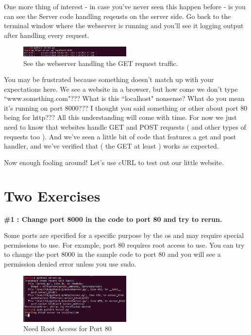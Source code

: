 \documentclass[10pt]{article}
\begin{document}
One more thing of interest - in case you've never seen this happen before - is you can see the Server code handling reqeusts on the server side. Go back to the terminal window where the webserver is running and you'll see it logging output after handling every request.

\begin{figure}[h]
  \centering
    \includegraphics[width=0.5\textwidth]{GET_ServerSide.png}
  \caption{See the webserver handling the GET request traffic. }
\end{figure}

You may be frustrated because something doesn't match up with your expectations here. We see a website in a browser, but how come we don't type ``www.something.com"??? What is this ``localhost" nonsense? What do you mean it's running on port 8000??? I thought you said something or other about port 80 being for http??? All this understanding will come with time. For now we just need to know that websites handle GET and POST requests ( and other types of requests too ). And we've seen a little bit of code that features a get and post handler, and we've verified that ( the GET at least ) works as expected.

Now enough fooling around! Let's use cURL to test out our little website.

\section{Two Exercises}
\begin{center}
\textbf{ \#1 : Change port 8000 in the code to port 80 and try to rerun.}
\end{center}

Some ports are specified for a specific purpose by the os and may require special permissions to use. For example, port 80 requires root access to use. You can try to change the port 8000 in the sample code to port 80 and you will see a permission denied error unless you use sudo.

\begin{figure}[h]
  \centering
    \includegraphics[width=0.5\textwidth]{needRootFor80.png}
  \caption{Need Root Access for Port 80}
\end{figure}
\end{document}

